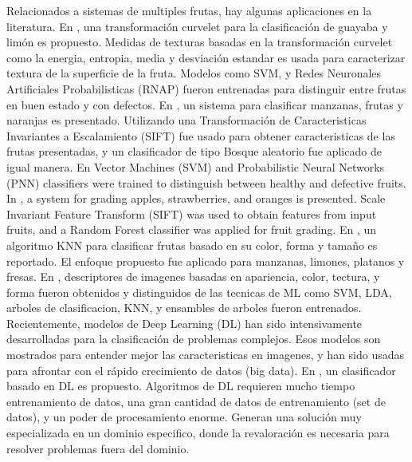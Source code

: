 \documentclass[twoside,spanish,ESP,MSc]{plantillaLabUPV}
\theoremstyle{definition}
\begin{document}
Relacionados a sistemas de multiples frutas, hay algunas aplicaciones en la literatura. En \cite{khoje}, una transformación curvelet para la clasificación de guayaba y limón es propuesto. Medidas de texturas basadas en la transformación curvelet como la energia, entropia, media y desviación estandar es usada para caracterizar textura de la superficie de la fruta. Modelos como SVM, y Redes Neuronales Artificiales  Probabilisticas (RNAP) fueron entrenadas para distinguir entre frutas en buen estado y con defectos. 
En \cite{7086191}, un sistema para clasificar manzanas, frutas y naranjas es presentado. Utilizando una Transformación de Caracteristicas Invariantes a Escalamiento (SIFT) fue usado para obtener caracteristicas de las frutas presentadas, y un clasificador de tipo Bosque aleatorio fue aplicado de igual manera. 
En  Vector Machines (SVM) and Probabilistic Neural Networks (PNN) classifiers were trained to distinguish between healthy and defective fruits.  In \cite{7086191}, a system for grading apples, strawberries, and oranges is presented. Scale Invariant Feature Transform (SIFT) was used to obtain features from input fruits, and a Random Forest classifier was applied for fruit grading.
En \cite{5254804}, un algoritmo KNN para clasificar frutas basado en su color, forma y tamaño es reportado. El enfoque propuesto fue aplicado para manzanas, limones, platanos y fresas. En \cite{ROCHA201096}, descriptores de imagenes basadas en apariencia, color, tectura, y forma fueron obtenidos y distinguidos de las tecnicas de ML como SVM, LDA, arboles de clasificacion, KNN, y ensambles de arboles fueron entrenados.\\




Recientemente, modelos de Deep Learning (DL) han sido intensivamente desarrolladas para la clasificación de problemas complejos. Esos modelos son mostrados para entender mejor las caracteristicas en imagenes, y han sido usadas para afrontar con el rápido crecimiento de datos (big data). En \cite{8488544}, un clasificador basado en DL es propuesto. Algoritmos de DL requieren mucho tiempo entrenamiento de datos, una gran cantidad de datos de entrenamiento (set de datos), y un poder de procesamiento enorme. Generan una solución muy especializada en un dominio especifico, donde la revaloración es necesaria para resolver problemas fuera del dominio.\\


\end{document}
